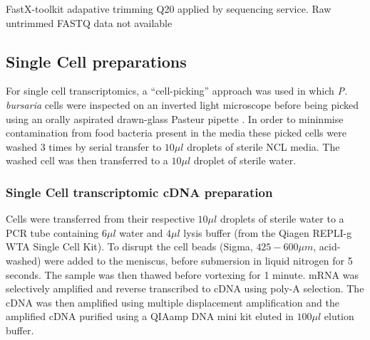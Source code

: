 FastX-toolkit adapative trimming Q20 applied by sequencing service.
Raw untrimmed FASTQ data not available




\subsection{Single Cell preparations}

For single cell transcriptomics, a ``cell-picking'' approach was used in which
\textit{P. bursaria} cells were inspected on an inverted light microscope before being picked
using an orally aspirated drawn-glass Pasteur pipette \citep{Garcia-Cuetos2012}.
In order to mininmise contamination from food bacteria present in the media these picked cells
were washed 3 times by serial transfer to \(10\mu l\) droplets of sterile NCL media.
The washed cell was then transferred to a \(10\mu l\) droplet of sterile water.

\subsubsection{Single Cell transcriptomic cDNA preparation}
Cells were transferred from their respective \(10\mu l\) droplets of sterile water to
a PCR tube containing \(6\mu l\) water and \(4\mu l \) lysis buffer (from the Qiagen
REPLI-g WTA Single Cell Kit). To disrupt the cell beads (Sigma, \(425-600\mu m\), acid-washed)
were added to the meniscus, before submersion in liquid nitrogen for 5 seconds.  The sample was 
then thawed before vortexing for 1 minute.  
mRNA was selectively amplified and reverse transcribed to cDNA using poly-A selection.  The cDNA
was then amplified using multiple displacement amplification and the amplified cDNA purified
using a QIAamp DNA mini kit eluted in \(100\mu l\) elution buffer.


